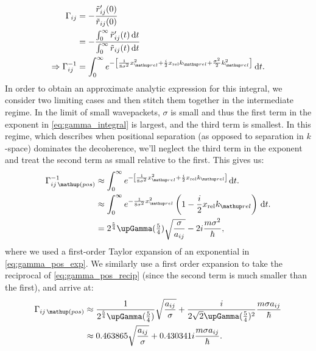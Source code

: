 \begin{align}
\Gamma_{ij} &= -\frac {\tilde r_{ij}^\prime(0)} {\tilde r_{ij}(0)}\\
&= -\frac {\int_0^\infty \tilde r_{ij}^\prime(t)\,\dd t} {\int_0^\infty \tilde r_{ij}(t)\, \dd t}\\
\Rightarrow \Gamma_{ij}^{-1}&= \int_0^\infty e^{-\left[
        \frac{1} {8\sigma^2} x_\up{rel}^2
      + \frac i2 x_{\mathrm{rel}} k_\up{rel}
      + \frac{\sigma^2}{2} k_\up{rel}^2
      \right]}\, \dd t.\label{eq:gamma_integral}
\end{align}
In order to obtain an approximate analytic expression for this integral, we consider two limiting cases and then stitch them together in the intermediate regime. In the limit of small wavepackets, $\sigma$ is small and thus the first term in the exponent in \eqref{eq:gamma_integral} is largest, and the third term is smallest. In this regime, which describes when positional separation (as opposed to separation in $k$-space) dominates the decoherence, we'll neglect the third term in the exponent and treat the second term as small relative to the first.
This gives us:
\begin{align}
\Gamma_{ij\,\up{(pos)}}^{-1} &\approx \int_0^\infty e^{-\left[
        \frac{1} {8\sigma^2} x_\up{rel}^2
      + \frac i2 x_{\mathrm{rel}} k_\up{rel}
      \right]}\, \dd t.\\
      &\approx \int_0^\infty e^{-
              \frac{1} {8\sigma^2} x_\up{rel}^2}\left(1 - \frac i2 x_{\mathrm{rel}} k_\up{rel}\right)\, \dd t.\label{eq:gamma_pos_exp}\\
      &= 2^{\frac54}\upGamma(\tfrac54)\sqrt{\frac{\sigma}{a_{ij}}} - 2i\frac{m \sigma^2}{\hbar},\label{eq:gamma_pos_recip}
\end{align}
where we used a first-order Taylor expansion of an exponential in \eqref{eq:gamma_pos_exp}. We similarly use a first order expansion to take the reciprocal of \eqref{eq:gamma_pos_recip} (since the second term is much smaller than the first), and arrive at:
\begin{align}
\Gamma_{ij\,\up{(pos)}} &\approx \frac1{2^{\frac54}\upGamma(\tfrac54)}\sqrt{\frac{a_{ij}}{\sigma}}
+ \frac i {2\sqrt{2}\upGamma(\tfrac54)^2} \frac{m\sigma a_{ij}}{\hbar}\\
&\approx 0.463865\sqrt{\frac{a_{ij}}{\sigma}}
+ 0.430341 i \frac{m\sigma a_{ij}}{\hbar}.
\end{align}
